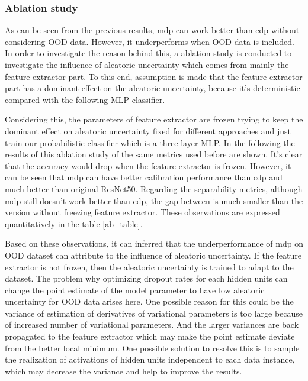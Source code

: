 \subsubsection{Ablation study}
As can be seen from the previous results, mdp can work better than cdp without considering OOD data. However, it underperforms when OOD data is included. In order to investigate the reason behind this, a ablation study is conducted to investigate the influence of aleatoric uncertainty which comes from mainly the feature extractor part. To this end, assumption is made that the feature extractor part has a dominant effect on the aleatoric uncertainty, because it's deterministic compared with the following \gls{MLP} classifier. 

Considering this, the parameters of feature extractor are frozen trying to keep the dominant effect on aleatoric uncertainty fixed for different approaches and just train our probabilistic classifier which is a three-layer \gls{MLP}. In the following the results of this ablation study of the same metrics used before are shown. It's clear that the accuracy would drop when the feature extractor is frozen. However, it can be seen that mdp can have better  calibration performance than cdp and much better than original ResNet50. Regarding the separability metrics, although mdp still doesn't work better than cdp, the gap between is much smaller than the version without freezing feature extractor. These observations are expressed quantitatively in the table \ref{ab_table}. 

Based on these observations, it can inferred that the underperformance of mdp on OOD dataset can attribute to the influence of aleatoric uncertainty. If the feature extractor is not frozen, then the aleatoric uncertainty is trained to adapt to the dataset. The problem why optimizing dropout rates for each hidden units can change the point estimate of the model parameter to have low aleatoric uncertainty for OOD data arises here. One possible reason for this could be the variance of estimation of derivatives of variational parameters is too large because of increased number of variational parameters\cite{kingma2015variational}. And the larger variances are back propagated to the feature extractor which may make the point estimate deviate from the better local minimum. One possible solution to resolve this is to sample the realization of activations of hidden units independent to each data instance, which may decrease the variance and help to improve the results. 

